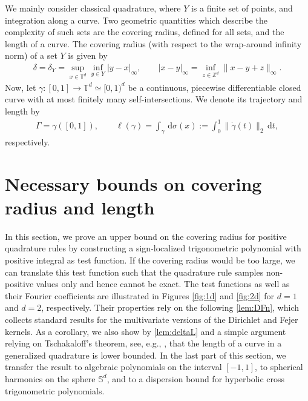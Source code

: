 \documentclass[11pt,a4paper,twoside,final,biblatex]{scrartcl}
\newcommand{\T}{\ensuremath{\mathbb{T}}}
\renewcommand{\S}{\ensuremath{\mathbb{S}}}
\newcommand{\Z}{\ensuremath{\mathbb{Z}}}
\renewcommand{\d}{\,\mathrm{d}}
\theoremstyle{definition}
\numberwithin{equation}{section}
\numberwithin{table}{section}
\numberwithin{figure}{section}
\begin{document}
We mainly consider classical quadrature, where $Y$ is a finite set of points, and integration along a curve. Two geometric quantities which describe the complexity of such sets are the covering radius, defined for all sets, and the length of a curve.
The covering radius (with respect to the wrap-around infinity norm) of a set $Y$ is given by
 \begin{align*}
     \delta=\delta_Y=\sup_{x\in\T^d} \inf_{y\in Y} |y-x|_\infty,\qquad
     |x-y|_\infty=\inf_{z\in\Z^d}\|x-y+z\|_\infty.
 \end{align*}
Now, let $\gamma\colon[0,1]\to\T^d\simeq [0,1)^d$ be a continuous, piecewise differentiable closed curve with at most finitely many self-intersections. We denote its trajectory and length by
 \begin{align*}
    \Gamma=\gamma([0,1]),\qquad
    \ell(\gamma)=\int_{\gamma}\d\sigma(x):=\int_0^1 \|\dot\gamma(t)\|_2\d t,
 \end{align*}
 respectively.

\section{Necessary bounds on covering radius and length}
In this section, we prove an upper bound on the covering radius for positive quadrature rules by constructing a sign-localized trigonometric polynomial with positive integral as test function.
If the covering radius would be too large, we can translate this test function such that the quadrature rule samples non-positive values only and hence cannot be exact.
The test functions as well as their Fourier coefficients are illustrated in Figures \ref{fig:1d} and \ref{fig:2d} for $d=1$ and $d=2$, respectively. Their properties rely on the following \cref{lem:DFn}, which collects standard results for the multivariate versions of the Dirichlet and Fejer kernels.
As a corollary, we also show by \cref{lem:deltaL} and a simple argument relying on Tschakaloff's theorem, see, e.g., \cite[Thm.~1.24]{Sc17}, that the length of a curve in a generalized quadrature is lower bounded.
In the last part of this section, we transfer the result to algebraic polynomials on the interval $[-1,1]$, to spherical harmonics on the sphere $\S^d$, and to a dispersion bound for hyperbolic cross trigonometric polynomials.
\end{document}
